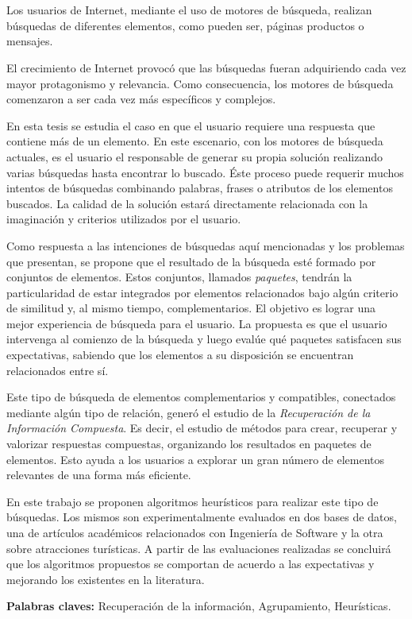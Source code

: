 \chapter*{\runtitulo}

\noindent 

Los usuarios de Internet, mediante el uso de motores de búsqueda, realizan búsquedas de diferentes elementos, como pueden ser, páginas productos o mensajes.

El crecimiento de Internet provocó que las búsquedas fueran adquiriendo cada vez mayor protagonismo y relevancia. Como consecuencia, los motores de búsqueda comenzaron a ser cada vez más específicos y complejos.

En esta tesis se estudia el caso en que el usuario requiere una respuesta que contiene más de un elemento. En este escenario, con los motores de búsqueda actuales, es el usuario el responsable de generar su propia solución realizando varias búsquedas hasta encontrar lo buscado. Éste proceso puede requerir muchos intentos de búsquedas combinando palabras, frases o atributos de los elementos buscados. La calidad de la solución estará directamente relacionada con la imaginación y criterios utilizados por el usuario.

Como respuesta a las intenciones de búsquedas aquí mencionadas y los problemas que presentan, se propone que el resultado de la búsqueda esté formado por conjuntos de elementos. Estos conjuntos, llamados {\em paquetes}, tendrán la particularidad de estar integrados por elementos relacionados bajo algún criterio de similitud y, al mismo tiempo, complementarios. El objetivo es lograr una mejor experiencia de búsqueda para el usuario. La propuesta es que el usuario intervenga al comienzo de la búsqueda y luego evalúe qué paquetes satisfacen sus expectativas, sabiendo que los elementos a su disposición se encuentran relacionados entre sí.

Este tipo de búsqueda de elementos complementarios y compatibles, conectados mediante algún tipo de relación, generó el estudio de la {\em Recuperación de la Información Compuesta}. Es decir, el estudio de métodos para crear, recuperar y valorizar respuestas compuestas, organizando los resultados en paquetes de elementos. Esto ayuda a los usuarios a explorar un gran número de elementos relevantes de una forma más eficiente.

En este trabajo se proponen algoritmos heurísticos para realizar este tipo de búsquedas. Los mismos son experimentalmente evaluados en dos bases de datos, una de artículos académicos relacionados con Ingeniería de Software y la otra sobre atracciones turísticas. A partir de las evaluaciones realizadas se concluirá que los algoritmos propuestos se comportan de acuerdo a las expectativas y mejorando los existentes en la literatura.
\bigskip



\noindent\textbf{Palabras claves:} Recuperación de la información, Agrupamiento, Heurísticas.